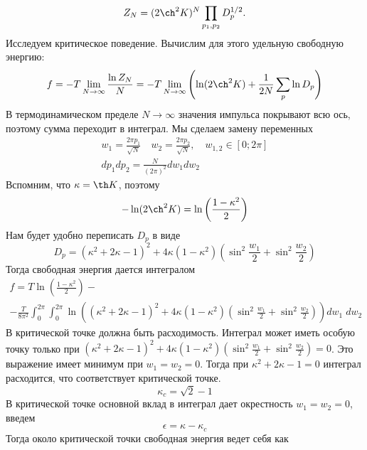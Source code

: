 \documentclass[a4paper,12pt]{article} \usepackage[utf8x]{inputenc} \usepackage[russian]{babel}
\theoremstyle{definition} \newtheorem{corollary}{Corollary}[theorem] \theoremstyle{definition}
\begin{document}
\begin{equation}
  \label{eq:133} Z_N=(2\ch^2 K)^N \prod_{p_1,p_2}D_p^{1/2}.
\end{equation} Исследуем критическое поведение. Вычислим для этого удельную свободную энергию:
\begin{equation}
  \label{eq:134} f=-T \lim_{N\to \infty}\frac{\ln Z_N}{N}=-T \lim_{N\to \infty} \left(\ln (2\ch^2
K)+\frac{1}{2N}\sum_p \ln D_p\right)
\end{equation} В термодинамическом пределе $N\to \infty$ значения импульса покрывают всю ось,
поэтому сумма переходит в интеграл. Мы сделаем замену переменных
\begin{eqnarray}
  \label{eq:135} w_1=\frac{2\pi p_1}{\sqrt N}\quad w_2=\frac{2\pi p_2}{\sqrt N},\quad w_{1,2}\in
[0;2\pi]\\ dp_1 dp_2=\frac{N}{(2\pi)^2} dw_1 dw_2
\end{eqnarray} Вспомним, что $\kappa=\th K$, поэтому
\begin{equation}
  \label{eq:136} -\ln(2\ch^2 K)=\ln\left(\frac{1-\kappa^2}{2}\right)
\end{equation} Нам будет удобно переписать $D_p$ в виде
\begin{equation}
  \label{eq:137} D_p=(\kappa^2+2\kappa -1)^2 +4\kappa (1-\kappa^2) \left(\sin^2 \frac{w_1}{2}
+\sin^2 \frac{w_2}{2}\right)
\end{equation} Тогда свободная энергия дается интегралом
\begin{multline}
  \label{eq:138} f=T\ln\left(\frac{1-\kappa^2}{2}\right)-\\
-\frac{T}{8\pi^2}\int_0^{2\pi}\int_0^{2\pi}\ln\left((\kappa^2 +2\kappa-1)^2 +4\kappa
(1-\kappa^2)\left(\sin^2 \frac{w_1}{2}+\sin^2\frac{w_2}{2}\right)\right) dw_1 \;dw_2
\end{multline} В критической точке должна быть расходимость. Интеграл может иметь особую точку
только при $(\kappa^2 +2\kappa-1)^2 +4\kappa (1-\kappa^2)\left(\sin^2
\frac{w_1}{2}+\sin^2\frac{w_2}{2}\right)=0$. Это выражение имеет минимум при $w_1=w_2=0$. Тогда при
$\kappa^2+2\kappa-1=0$ интеграл расходится, что соответствует критической точке.
\begin{equation}
  \label{eq:139} \kappa_c=\sqrt 2 -1
\end{equation} В критической точке основной вклад в интеграл дает окрестность $w_1=w_2=0$, введем
\begin{equation}
  \label{eq:140} \epsilon=\kappa-\kappa_c
\end{equation} Тогда около критической точки свободная энергия ведет себя как
\end{document}
